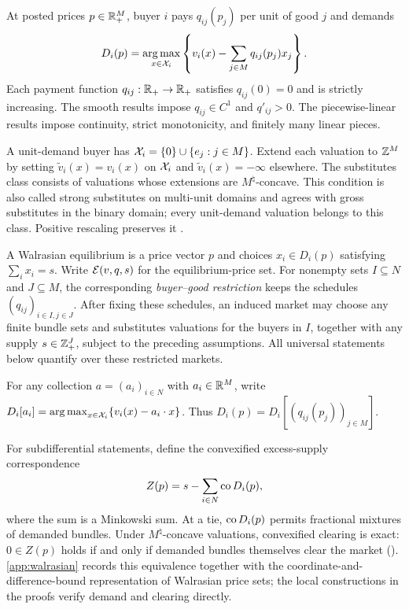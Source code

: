 At posted prices $p\in\mathbb{R}_+^M$, buyer $i$ pays $q_{ij}(p_j)$ per unit of good $j$ and demands
\begin{equation}\label{eq:demand}
D_i(p)=\operatorname*{arg\,max}_{x\in\mathcal{X}_i}
\left\{v_i(x)-\sum_{j\in M}q_{ij}(p_j)x_j\right\}.
\end{equation}
Each payment function $q_{ij}:\mathbb{R}_+\to\mathbb{R}_+$ satisfies $q_{ij}(0)=0$ and is strictly increasing. The smooth results impose $q_{ij}\in C^1$ and $q'_{ij}>0$. The piecewise-linear results impose continuity, strict monotonicity, and finitely many linear pieces.

A unit-demand buyer has $\mathcal{X}_i=\{0\}\cup\{e_j:j\in M\}$. Extend each valuation to $\mathbb{Z}^M$ by setting $\widetilde v_i(x)=v_i(x)$ on $\mathcal{X}_i$ and $\widetilde v_i(x)=-\infty$ elsewhere. The substitutes class consists of valuations whose extensions are $M^\natural$-concave. This condition is also called strong substitutes on multi-unit domains and agrees with gross substitutes in the binary domain; every unit-demand valuation belongs to this class. Positive rescaling preserves it \citep{murota2003,murota2016,paesleme2017}.

A Walrasian equilibrium is a price vector $p$ and choices $x_i\in D_i(p)$ satisfying $\sum_i x_i=s$. Write $\mathcal{E}(v,q,s)$ for the equilibrium-price set. For nonempty sets $I\subseteq N$ and $J\subseteq M$, the corresponding \emph{buyer--good restriction} keeps the schedules $(q_{ij})_{i\in I,j\in J}$. After fixing these schedules, an induced market may choose any finite bundle sets and substitutes valuations for the buyers in $I$, together with any supply $s\in\mathbb{Z}_+^J$, subject to the preceding assumptions. All universal statements below quantify over these restricted markets.

For any collection $a=(a_i)_{i\in N}$ with $a_i\in\mathbb{R}^M$, write $D_i[a_i]=\operatorname*{arg\,max}_{x\in\mathcal{X}_i}\{v_i(x)-a_i\cdot x\}$. Thus $D_i(p)=D_i[(q_{ij}(p_j))_{j\in M}]$.

For subdifferential statements, define the convexified excess-supply correspondence
\begin{equation}\label{eq:Z}
Z(p)=s-\sum_{i\in N}\operatorname{co} D_i(p),
\end{equation}
where the sum is a Minkowski sum. At a tie, $\operatorname{co} D_i(p)$ permits fractional mixtures of demanded bundles. Under $M^\natural$-concave valuations, convexified clearing is exact: $0\in Z(p)$ holds if and only if demanded bundles themselves clear the market (). \ref{app:walrasian} records this equivalence together with the coordinate-and-difference-bound representation of Walrasian price sets; the local constructions in the proofs verify demand and clearing directly.

